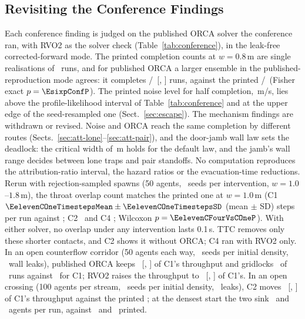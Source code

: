 \subsection{Revisiting the Conference Findings}\label{sec:conference}

Each conference finding is judged on the published ORCA solver the conference ran, with RVO2 as the solver check (Table~\ref{tab:conference}), in the leak-free corrected-forward mode. The printed completion counts at $w=0.8$\,m are single realisations of \TabFourConfN\ runs, and for published ORCA a larger ensemble in the published-reproduction mode agrees: it completes \EsixpK/\EsixpN\ [\EsixpLo, \EsixpHi] runs, against the printed \TabFourConfCThreeK/\TabFourConfN\ (Fisher exact $p=\EsixpConfP$). The printed noise level for half completion, \EfiveConfSigmaFifty\,m/s, lies above the profile-likelihood interval of Table~\ref{tab:conference} and at the upper edge of the seed-resampled one (Sect.~\ref{sec:escape}). The mechanism findings are withdrawn or revised. Noise and ORCA reach the same completion by different routes (Sects.~\ref{sec:att-lone}--\ref{sec:att-pair}), and the door-jamb wall law sets the deadlock: the critical width of \EsevenWcrit\,m holds for the default law, and the jamb's wall range decides between lone traps and pair standoffs. No computation reproduces the attribution-ratio interval, the hazard ratios or the evacuation-time reductions. Rerun with rejection-sampled spawns (50 agents, \EelevenN\ seeds per intervention, $w=1.0$--$1.8$\,m), the throat overlap count matches the printed one at $w=1.0$\,m (C1 $\EelevenCOneTimestepsMean\pm\EelevenCOneTimestepsSD$ (mean $\pm$ SD) steps per run against \TabFourConfThroatCOne; C2 \EelevenCTwoTimestepsMean\ and C4 \EelevenCFourTimestepsMean; Wilcoxon $p=\EelevenCFourVsCOneP$). With either solver, no overlap under any intervention lasts 0.1\,s. TTC removes only these shorter contacts, and C2 shows it without ORCA; C4 ran with RVO2 only. In an open counterflow corridor (50 agents each way, \EeightN\ seeds per initial density, \EeightLeaks\ wall leaks), published ORCA keeps \EeightCThreePubRatio\ [\EeightCThreePubRatioLo, \EeightCThreePubRatioHi] of C1's throughput and gridlocks \EeightCThreePubGridlock\ of \EeightRunsTotal\ runs against \EeightCOneGridlock\ for C1; RVO2 raises the throughput to \EeightCThreeRatio\ [\EeightCThreeRatioLo, \EeightCThreeRatioHi] of C1's. In an open crossing (100 agents per stream, \EnineN\ seeds per initial density, \EnineLeaks\ leaks), C2 moves \EnineCTwoRatio\ [\EnineCTwoRatioLo, \EnineCTwoRatioHi] of C1's throughput against the printed \TabFourConfCrossIRR; at the densest start the two sink \EnineCTwoExitsDense\ and \EnineCOneExitsDense\ agents per run, against \TabFourConfCrossCTwo\ and \TabFourConfCrossCOne\ printed.
